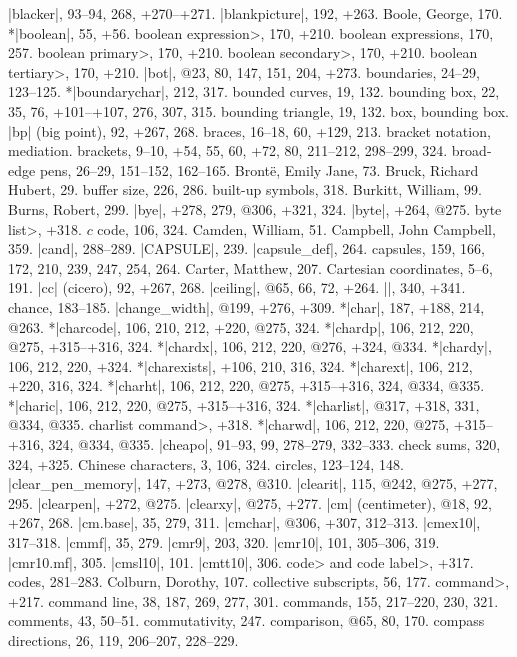 |blacker|, 93--94, 268, +270--+271.
|blankpicture|, 192, +263.
Boole, George, 170.
*|boolean|, 55, +56.
\<boolean expression>, 170, +210.
boolean expressions, 170, 257.
\<boolean primary>, 170, +210.
\<boolean secondary>, 170, +210.
\<boolean tertiary>, 170, +210.
|bot|, @23, 80, 147, 151, 204, +273.
boundaries, 24--29, 123--125.
*|boundarychar|, 212, 317.
bounded curves, 19, 132.
bounding box, 22, 35, 76, +101--+107, 276, 307, 315.
bounding triangle, 19, 132.
box, \see bounding box.
|bp| (big point), 92, +267, 268.
braces, 16--18, 60, +129, 213.
bracket notation, \see mediation.
brackets, 9--10, +54, 55, 60, +72, 80, 211--212, 298--299, 324.
broad-edge pens, 26--29, 151--152, 162--165.
Bront\"e, Emily Jane, 73.
Bruck, Richard Hubert, 29.
buffer size, 226, 286.
built-up symbols, 318.
Burkitt, William, 99.
Burns, Robert, 299.
|bye|, +278, 279, @306, +321, 324.
|byte|, +264, @275.
\<byte list>, +318.
\newletter
$c$ code, 106, 324.
Camden, William, 51.
Campbell, John Campbell, 359.
|cand|, 288--289.
|CAPSULE|, 239.
|capsule_def|, 264.
capsules, 159, 166, 172, 210, 239, 247, 254, 264.
Carter, Matthew, 207.
Cartesian coordinates, 5--6, 191.
|cc| (cicero), 92, +267, 268.
|ceiling|, @65, 66, 72, +264.
|\centerlargechars|, 340, +341.
chance, 183--185.
|change_width|, @199, +276, +309.
*|char|, 187, +188, 214, @263.
*|charcode|, 106, 210, 212, +220, @275, 324.
*|chardp|, 106, 212, 220, @275, +315--+316, 324.
*|chardx|, 106, 212, 220, @276, +324, @334.
*|chardy|, 106, 212, 220, +324.
*|charexists|, +106, 210, 316, 324.
*|charext|, 106, 212, +220, 316, 324.
*|charht|, 106, 212, 220, @275, +315--+316, 324, @334, @335.
*|charic|, 106, 212, 220, @275, +315--+316, 324.
*|charlist|, @317, +318, 331, @334, @335.
\<charlist command>, +318.
*|charwd|, 106, 212, 220, @275, +315--+316, 324, @334, @335.
|cheapo|, 91--93, 99, 278--279, 332--333.
check sums, 320, 324, +325.
Chinese characters, 3, 106, 324.
circles, 123--124, 148.
|clear_pen_memory|, 147, +273, @278, @310.
|clearit|, 115, @242, @275, +277, 295.
|clearpen|, +272, @275.
|clearxy|, @275, +277.
|cm| (centimeter), @18, 92, +267, 268.
|cm.base|, 35, 279, 311.
|cmchar|, @306, +307, 312--313.
|cmex10|, 317--318.
|cmmf|, 35, 279.
|cmr9|, 203, 320.
|cmr10|, 101, 305--306, 319.
|cmr10.mf|, 305.
|cmsl10|, 101.
|cmtt10|, 306.
\<code> and \<code label>, +317.
codes, 281--283.
Colburn, Dorothy, 107.
collective subscripts, 56, 177.
\<command>, +217.
command line, 38, 187, 269, 277, 301.
commands, 155, 217--220, 230, 321.
comments, 43, 50--51.
commutativity, 247.
comparison, @65, 80, 170.
compass directions, 26, 119, 206--207, 228--229.
